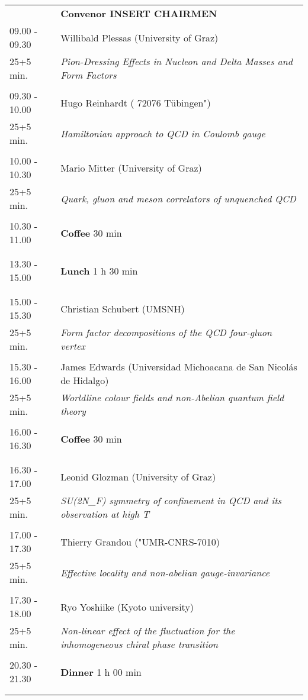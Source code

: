 \begin{longtable}{p{3cm}p{13cm}}
&\hfill {\bf Convenor INSERT CHAIRMEN }\\ 
09.00 - 09.30 & Willibald Plessas (University of Graz)\\ 
25+5 min. & {\it Pion-Dressing Effects in Nucleon and Delta Masses and Form Factors}\\ 
 & \\ 
09.30 - 10.00 & Hugo Reinhardt ( 72076 Tübingen")\\ 
25+5 min. & {\it Hamiltonian approach to QCD in Coulomb gauge}\\ 
 & \\ 
10.00 - 10.30 & Mario Mitter (University of Graz)\\ 
25+5 min. & {\it Quark, gluon and meson correlators of unquenched QCD}\\ 
 & \\ 
10.30 - 11.00 & {\bf Coffee} \hfill 30 min \\ 
 & \\ 
 & \\ 
13.30 - 15.00 & {\bf Lunch} \hfill 1 h 30 min \\ 
 & \\ 
 & \\ 
15.00 - 15.30 & Christian Schubert (UMSNH)\\ 
25+5 min. & {\it Form factor decompositions of the QCD four-gluon vertex}\\ 
 & \\ 
15.30 - 16.00 & James Edwards (Universidad Michoacana de San Nicolás de Hidalgo)\\ 
25+5 min. & {\it Worldline colour fields and non-Abelian quantum field theory}\\ 
 & \\ 
16.00 - 16.30 & {\bf Coffee} \hfill 30 min \\ 
 & \\ 
 & \\ 
16.30 - 17.00 & Leonid Glozman (University of Graz)\\ 
25+5 min. & {\it SU(2N\_F) symmetry of confinement in QCD and its observation at high T}\\ 
 & \\ 
17.00 - 17.30 & Thierry Grandou ("UMR-CNRS-7010)\\ 
25+5 min. & {\it Effective locality and non-abelian gauge-invariance}\\ 
 & \\ 
17.30 - 18.00 & Ryo Yoshiike (Kyoto university)\\ 
25+5 min. & {\it Non-linear effect of the fluctuation for the inhomogeneous chiral phase transition}\\ 
 & \\ 
20.30 - 21.30 & {\bf Dinner} \hfill 1 h 00 min \\ 
 & \\ 
 & \\ 
\end{longtable}

